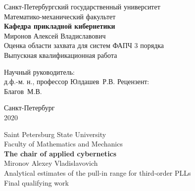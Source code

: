 \documentclass[a4paper,14pt]{article} %
\begin{document}

 
\begin{center}
\hfill \break
\normalsize{Санкт-Петербургский государственный университет}\\ 
\hfill \break
\normalsize{Математико-механический факультет}\\
\normalsize{\textbf{Кафедра прикладной кибернетики}}\\
\hfill \break
\hfill \break 
\hfill \break
\hfill \break
\hfill\break
\hfill \break
\normalsize{Миронов Алексей Владиславович}\\
\hfill \break
\large{Оценка области захвата для систем ФАПЧ 3 порядка}\\
\hfill \break
\small{Выпускная квалификационная работа}\\
\hfill \break
\hfill \break
\hfill \break
\hfill \break
\hfill \break
\hfill \break
\end{center}
 
\hfill \break
\hfill \break
\hfill \break
 
 \small{
\begin{flushright}
Научный руководитель:\\
д.ф.-м. н., профессор Юлдашев~Р.\:В.
\break \break
\break \break
Рецензент:\\
Благов~М.\:В.
\end{flushright}
}
\hfill \break
\hfill \break
\hfill \break
\hfill \break
\hfill \break
\hfill \break
\hfill \break
\hfill \break
\hfill \break
\hfill \break
\begin{center} Санкт-Петербург \\
2020 \end{center}
\thispagestyle{empty} %

\begin{center}
\hfill \break
\normalsize{Saint Petersburg State University}\\ 
\hfill \break
\normalsize{Faculty of Mathematics and Mechanics}\\
\normalsize{\textbf{The chair of applied cybernetics}}\\
\hfill \break
\hfill \break 
\hfill \break
\hfill \break
\hfill\break
\hfill \break
\normalsize{Mironov Alexey Vladislavovich}\\
\hfill \break
\large{Analytical estimates of the pull-in range for third-order PLLs}\\
\hfill \break
\small{Final qualifying work}\\
\hfill \break
\hfill \break
\hfill \break
\hfill \break
\hfill \break
\hfill \break
\end{center}
 
\end{document}
